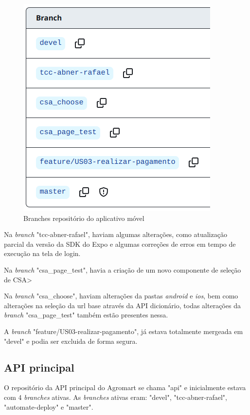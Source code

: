 \begin{figure}[h]
	\centering
	\includegraphics[keepaspectratio=true,scale=0.5]{figuras/banches_mobile.png}
	\caption{Branches repositório do aplicativo móvel}
\end{figure}

Na \textit{branch} "tcc-abner-rafael", haviam algumas alterações, como atualização parcial da versão da SDK do Expo e algumas correções de erros em tempo de execução na tela de login.

Na \textit{branch} "csa\_page\_test", havia a criação de um novo componente de seleção de CSA>

Na \textit{branch} "csa\_choose", haviam alterações da pastas \textit{android} e \textit{ios}, bem como alterações na seleção da url base através da API dicionário, todas alterações da \textit{branch} "csa\_page\_test" também estão presentes nessa.

A \textit{branch} "feature/US03-realizar-pagamento", já estava totalmente mergeada em "devel" e podia ser excluida de forma segura.

\subsection{API principal}
O repositório da API principal do Agromart se chama "api" e inicialmente estava com 4 \textit{branches} ativas. As \textit{branches} ativas eram: "devel", "tcc-abner-rafael", "automate-deploy" e "master".

